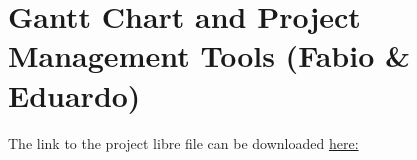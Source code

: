  \section{Gantt Chart and Project Management Tools (Fabio \& Eduardo)}
 \label{sec:GanttChart}
 The link to the project libre file can be downloaded \href{https://github.com/fabiomatos999/M.O.S.I.S/blob/capstone/Proposal%20Report/Project%20Schedule/M.O.S.I.S%20UI%202.0%20Schedule.pod}{here:}
 